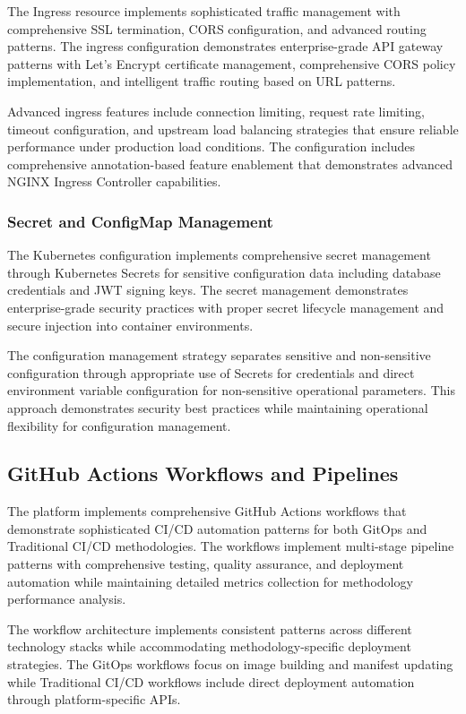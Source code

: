 The Ingress resource implements sophisticated traffic management with comprehensive SSL termination, CORS configuration, and advanced routing patterns. The ingress configuration demonstrates enterprise-grade API gateway patterns with Let's Encrypt certificate management, comprehensive CORS policy implementation, and intelligent traffic routing based on URL patterns.

Advanced ingress features include connection limiting, request rate limiting, timeout configuration, and upstream load balancing strategies that ensure reliable performance under production load conditions. The configuration includes comprehensive annotation-based feature enablement that demonstrates advanced NGINX Ingress Controller capabilities.

\subsubsection{Secret and ConfigMap Management}

The Kubernetes configuration implements comprehensive secret management through Kubernetes Secrets for sensitive configuration data including database credentials and JWT signing keys. The secret management demonstrates enterprise-grade security practices with proper secret lifecycle management and secure injection into container environments.

The configuration management strategy separates sensitive and non-sensitive configuration through appropriate use of Secrets for credentials and direct environment variable configuration for non-sensitive operational parameters. This approach demonstrates security best practices while maintaining operational flexibility for configuration management.

\subsection{GitHub Actions Workflows and Pipelines}

The platform implements comprehensive GitHub Actions workflows that demonstrate sophisticated CI/CD automation patterns for both GitOps and Traditional CI/CD methodologies. The workflows implement multi-stage pipeline patterns with comprehensive testing, quality assurance, and deployment automation while maintaining detailed metrics collection for methodology performance analysis.

The workflow architecture implements consistent patterns across different technology stacks while accommodating methodology-specific deployment strategies. The GitOps workflows focus on image building and manifest updating while Traditional CI/CD workflows include direct deployment automation through platform-specific APIs.

